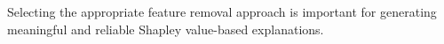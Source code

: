 
Selecting the appropriate feature removal approach is important for generating meaningful and reliable Shapley value-based explanations.